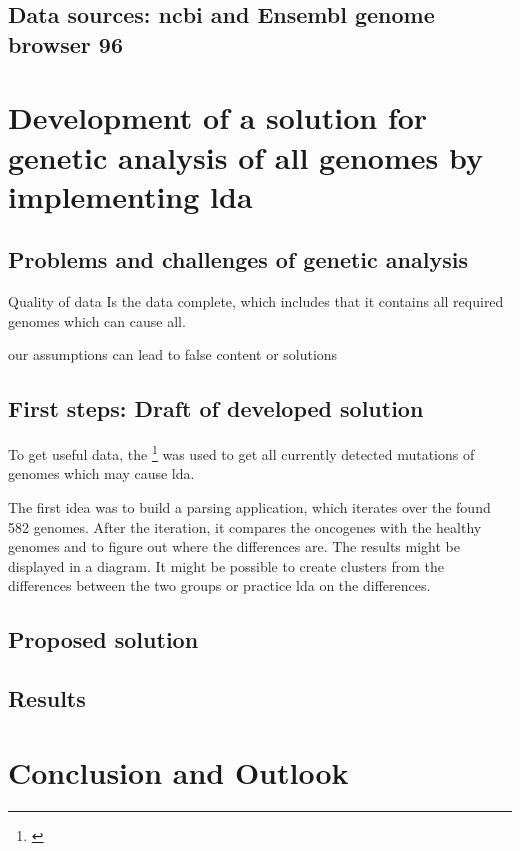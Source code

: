 \section{Data sources: \gls{ncbi} and Ensembl genome browser 96}\label{datasources}

\chapter{Development of a solution for genetic analysis of \gls{all} genomes by implementing \gls{lda}}\label{development}
\section{Problems and challenges of genetic analysis}\label{problems_challenges}
Quality of data 
Is the data complete, which includes that it contains all required genomes which can cause \gls{all}.



our assumptions can lead to false content or solutions 

\section{First steps: Draft of developed solution}\label{draft}

To get useful data, the \footnote{\autocite{ncbi}} was used to get all currently detected mutations of genomes which may cause \gls{lda}.

The first idea was to build a parsing application, which iterates over the found 582 genomes. After the iteration, it compares the oncogenes with the healthy genomes and to figure out where the differences are. The results might be displayed in a diagram. It might be possible to create clusters from the differences between the two groups or practice \gls{lda} on the differences.

\section{Proposed solution}\label{proposed_solution}
\section{Results}\label{results}


\chapter{Conclusion and Outlook}\label{conclusion_outlook}
